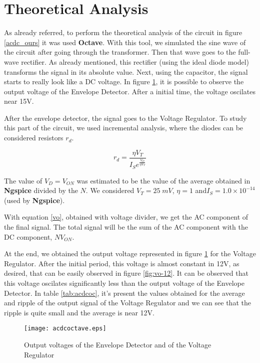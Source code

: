 \section{Theoretical Analysis}
\label{sec:analysis}

As already referred, to perform the theoretical analysis of the circuit in figure \ref{acdc_ours} it was used {\bf Octave}. With this tool, we simulated the sine wave of the circuit after going through the transformer. Then that wave goes to the full-wave rectifier. As already mentioned, this rectifier (using the ideal diode model) transforms the signal in its absolute value. Next, using the capacitor, the signal starts to really look like a DC voltage. In figure \ref{fig:acdcoc}, it is possible to observe the output voltage of the Envelope Detector. After a initial time, the voltage oscilates near 15V.

After the envelope detector, the signal goes to the Voltage Regulator. To study this part of the circuit, we used incremental analysis, where the diodes can be considered resistors $r_d$.

\begin{equation}
        r_d = \frac{\eta V_T}{I_Se^{\frac{V_D}{\eta V_T}}}
        \label{rd}
\end{equation}

The value of $V_D = V_{ON}$ was estimated to be the value of the average obtained in {\bf Ngspice} divided by the $N$. We considered $V_T=25\;mV$, $\eta = 1$ and$I_S = 1.0 \times 10^{-14}$ (used by {\bf Ngspice}).

With equation \ref{vo}, obtained with voltage divider, we get the AC component of the final signal. The total signal will be the sum of the AC component with the DC component, $N V_{ON}$.

At the end, we obtained the output voltage represented in figure \ref{fig:acdcoc} for the Voltage Regulator. After the initial period, this voltage is almost constant in 12V, as desired, that can be easily observed in figure \ref{fig:vo-12}. It can be observed that this voltage oscilates significantly less than the output voltage of the Envelope Detector. In table \ref{tab:acdcoc}, it's present the values obtained for the average and ripple of the output signal of the Voltage Regulator and we can see that the ripple is quite small and the average is near 12V.

\begin{figure}[H]
  \centering
  \texttt{[image: acdcoctave.eps]}
  \caption{Output voltages of the Envelope Detector and of the Voltage Regulator}
  \label{fig:acdcoc}
\end{figure}

